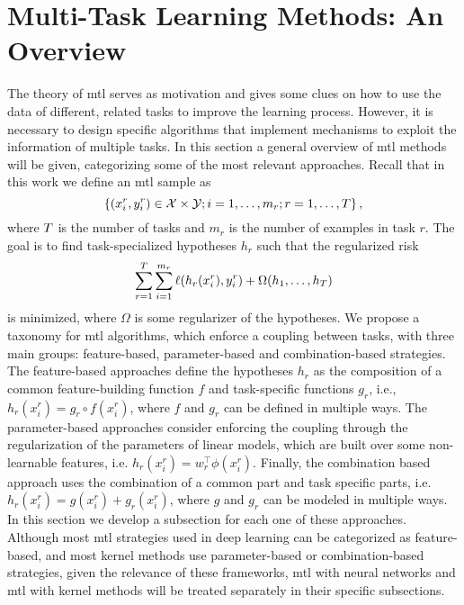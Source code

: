 \section{Multi-Task Learning Methods: An Overview}\label{sec:ch3_overview}
The theory of \acrshort{mtl} serves as motivation and gives some clues on how to use the data of different, related tasks to improve the learning process. However, it is necessary to design specific algorithms that implement mechanisms to exploit the information of multiple tasks.
In this section a general overview of \acrshort{mtl} methods will be given, categorizing some of the most relevant approaches. 
%
Recall that in this work we define an \acrshort{mtl} sample as
$$ \left\{(x_i^r, y_i^r) \in \mathcal{X} \times \mathcal{Y}; i=1,\ldots, m_r; r=1,\ldots, T\right\},$$
where $T$ is the number of tasks and $m_r$ is the number of examples in task $r$.
The goal is to find task-specialized hypotheses $h_r$ such that the regularized risk 
\begin{equation}
    \nonumber
    \sum_{r=1}^T \sum_{i=1}^{m_r} \ell(h_r(x_i^r), y_i^r) + \Omega(h_1, \ldots, h_T)
\end{equation}
is minimized, where $\Omega$ is some regularizer of the hypotheses. 
We propose a taxonomy for \acrshort{mtl} algorithms, which enforce a coupling between tasks, with three main groups: feature-based, parameter-based and combination-based strategies. 
The feature-based approaches define the hypotheses $h_r$ as the composition of a common feature-building function $f$ and task-specific functions $g_r$, i.e., $h_r(x_i^r) = g_r \circ f(x_i^r)$, where $f$ and $g_r$ can be defined in multiple ways.
The parameter-based approaches consider enforcing the coupling through the regularization of the parameters of linear models, which are built over some non-learnable features, i.e. $h_r(x_i^r) = w_r^\intercal \phi(x_i^r)$.
Finally, the combination based approach uses the combination of a common part and task specific parts, i.e. $h_r(x_i^r) = g(x_i^r) + g_r(x_i^r)$, where $g$ and $g_r$ can be modeled in multiple ways.
In this section we develop a subsection for each one of these approaches.
%
Although most \acrshort{mtl} strategies used in deep learning can be categorized as feature-based, and most kernel methods use parameter-based or combination-based strategies, given the relevance of these frameworks, \acrshort{mtl} with neural networks and \acrshort{mtl} with kernel methods will be treated separately in their specific subsections. 

